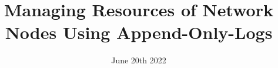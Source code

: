 \documentclass[a4paper, 10pt, oneside]{memoir}
\title				{Managing Resources of Network Nodes Using Append-Only-Logs}
\date				{June 20th 2022}
\begin{document}

\thesisfront
\maketitle
\pagestyle{thesis}
% 

\thesistoc
\thesismain




%
%
%
%
\thesisappendix
\thesisbib
\begin{appendices}
	 
\end{appendices}
\thesisback
{}
  {}
  {}
\end{document}
